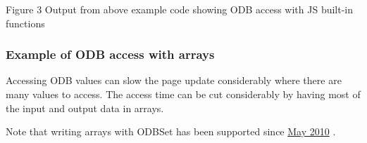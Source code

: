\par
\par
\par
 \begin{center} Figure 3 Output from above example code showing ODB access with JS built-\/in functions \par
\par
\par
  \par
\par
\par
 \end{center} \hypertarget{RC_mhttpd_custom_ODB_access_examples_RC_mhttpd_js_example3}{}\subsubsection{Example of ODB access with arrays}\label{RC_mhttpd_custom_ODB_access_examples_RC_mhttpd_js_example3}
Accessing ODB values can slow the page update considerably where there are many values to access. The access time can be cut considerably by having most of the input and output data in arrays.

 Note that writing arrays with ODBSet has been supported since \hyperlink{NDF_ndf_may_2010}{May 2010} . 

